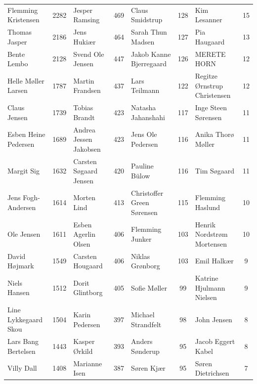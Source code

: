 \begin{table}[h]
\begin{tabular}{l|c|l|c|l|c|l|c}
		Flemming Kristensen   &  2282  & Jesper Ramsing             &  469   & Claus Smidstrup              &  128   & Kim Lesanner                 &   15   \\
		Thomas Jasper         &  2186  & Jens Hukiær                &  464   & Sarah Thun Madsen            &  127   & Pia Haugaard                 &   13   \\
		Bente Lembo           &  2128  & Svend Ole Jensen           &  447   & Jakob Kanne Bjerregaard      &  126   & MERETE HORN                  &   12   \\
		Helle Møller Larsen   &  1787  & Martin Frandsen            &  437   & Lars Teilmann                &  122   & Regitze Ørnstrup Christensen &   12   \\
		Claus Jensen          &  1739  & Tobias Brandt              &  423   & Natasha Jahanshahi           &  117   & Inge Steen Sørensen          &   11   \\
		Esben Heine Pedersen  &  1689  & Andrea Jessen Jakobsen     &  423   & Jens Ole Pedersen            &  116   & Anika Thorø Møller           &   11   \\
		Margit Sig            &  1632  & Carsten Søgaard Jensen     &  420   & Pauline Bülow                &  116   & Tim Søgaard                  &   11   \\
		Jens Fogh-Andersen    &  1614  & Morten Lind                &  413   & Christoffer Green Sørensen   &  115   & Flemming Haslund             &   10   \\
		Ole Jensen            &  1611  & Esben Agerlin Olsen        &  406   & Flemming Junker              &  103   & Henrik Nordstrøm Mortensen   &   10   \\
		David Højmark         &  1549  & Carsten Hougaard           &  406   & Niklas Grønborg              &  103   & Emil Halkær                  &   9    \\
		Niels Hansen          &  1512  & Dorit Glintborg            &  405   & Sofie Møller                 &   99   & Katrine Hjulmann Nielsen     &   9    \\
		Line Lykkegaard Skou  &  1504  & Karin Pedersen             &  397   & Michael Strandfelt           &   98   & John Jensen                  &   8    \\
		Lars Bang Bertelsen   &  1443  & Kasper Ørkild              &  393   & Anders Sønderup              &   95   & Jacob Eggert Kabel           &   8    \\
		Villy Dall            &  1408  & Marianne Isen              &  387   & Søren Kjær                   &   95   & Søren Dietrichsen            &   7    \\

\end{tabular}
\end{table}
